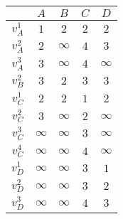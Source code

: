 \begin{tabular}{|c|c|c|c|c|}
\hline
& $A$ & $B$ & $C$ & $D$ \\
\hline 
$v_A^1$ & $1$ & $2$ & $2$ & $2$ \\
\hline 
$v_A^2$ & $2$ & $\infty$ & $4$ & $3$ \\
\hline 
$v_A^3$ & $3$ & $\infty$ & $4$ & $\infty$ \\
\hline 
$v_B^2$ & $3$ & $2$ & $3$ & $3$ \\
\hline 
$v_C^1$ & $2$ & $2$ & $1$ & $2$ \\
\hline 
$v_C^2$ & $3$ & $\infty$ & $2$ & $\infty$ \\
\hline 
$v_C^3$ & $\infty$ & $\infty$ & $3$ & $\infty$ \\
\hline 
$v_C^4$ & $\infty$ & $\infty$ & $4$ & $\infty$ \\
\hline 
$v_D^1$ & $\infty$ & $\infty$ & $3$ & $1$ \\
\hline 
$v_D^2$ & $\infty$ & $\infty$ & $3$ & $2$ \\
\hline 
$v_D^3$ & $\infty$ & $\infty$ & $4$ & $3$ \\
\hline 
\end{tabular}